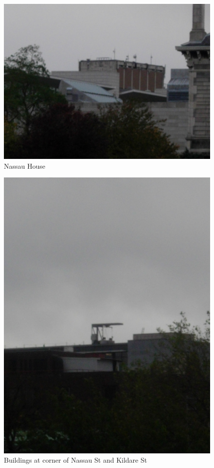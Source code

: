 \documentclass[a4paper,12pt]{article}
\begin{document}
\begin{figure}[h]

\includegraphics{5.png}

\caption{Nassau House}

\end{figure}

\begin{figure}[h]

\includegraphics{6.png}

\caption{Buildings at corner of Nassau St and Kildare St}

\end{figure}
\end{document}
